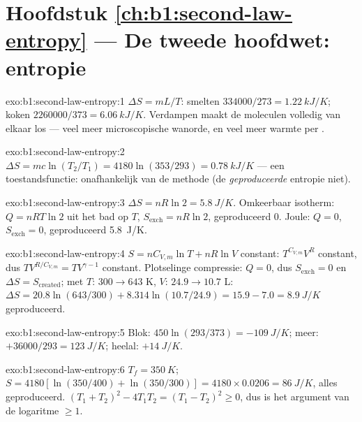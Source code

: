 \section*{Hoofdstuk \ref{ch:b1:second-law-entropy} --- De tweede hoofdwet: entropie}

\begin{solution}{exo:b1:second-law-entropy:1}
$\Delta S = mL/T$: smelten $334000/273 = \qty{1.22}{kJ/K}$; koken $2260000/
373 = \qty{6.06}{kJ/K}$. Verdampen maakt de moleculen volledig van elkaar
los --- veel meer microscopische wanorde, en veel meer warmte per
.
\end{solution}

\begin{solution}{exo:b1:second-law-entropy:2}
$\Delta S = mc\ln(T_2/T_1) = 4180\ln(353/293) = \qty{0.78}{kJ/K}$ --- een
toestandsfunctie: onafhankelijk van de methode (de \emph{geproduceerde} entropie niet).
\end{solution}

\begin{solution}{exo:b1:second-law-entropy:3}
$\Delta S = nR\ln2 = \qty{5.8}{J/K}$. Omkeerbaar isotherm: $Q = nRT\ln2$
uit het bad op $T$, $S_{\mathrm{exch}} = nR\ln2$, geproduceerd $0$. Joule:
$Q = 0$, $S_{\mathrm{exch}} = 0$, geproduceerd \qty{5.8}{J/K}.
\end{solution}

\begin{solution}{exo:b1:second-law-entropy:4}
$S = nC_{V,m}\ln T + nR\ln V$ constant: $T^{C_{V,m}}V^R$ constant, dus
$TV^{R/C_{V,m}} = TV^{\gamma - 1}$ constant. Plotselinge compressie: $Q = 0$, dus
$S_{\mathrm{exch}} = 0$ en $\Delta S = S_{\mathrm{created}}$; met $T$: $300 \to
643$ K, $V$: $24.9 \to 10.7$ L: $\Delta S = 20.8\ln(643/300) + 8.314\ln(10.7/
24.9) = 15.9 - 7.0 = \qty{+8.9}{J/K}$ geproduceerd.
\end{solution}

\begin{solution}{exo:b1:second-law-entropy:5}
Blok: $450\ln(293/373) = \qty{-109}{J/K}$; meer: $+36000/293 = \qty{+123}{J/K}$;
heelal: $+\qty{14}{J/K}$.
\end{solution}

\begin{solution}{exo:b1:second-law-entropy:6}
$T_f = \qty{350}{K}$; $S = 4180[\ln(350/400) + \ln(350/300)] = 4180 \times
0.0206 = \qty{86}{J/K}$, alles geproduceerd. $(T_1 + T_2)^2 - 4T_1T_2 = (T_1 - T_2)^2
\geq 0$, dus is het argument van de logaritme $\geq 1$.
\end{solution}

